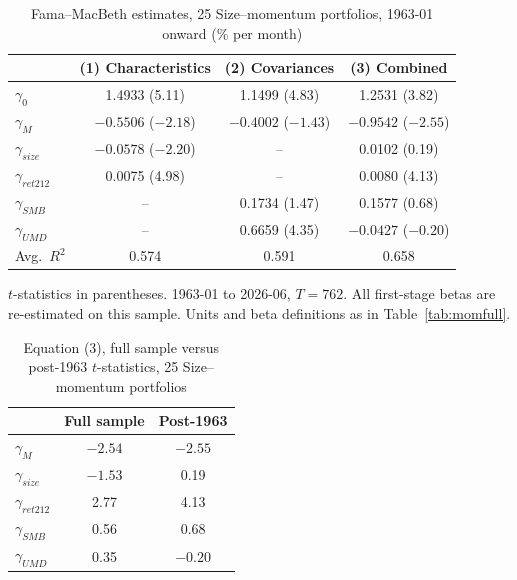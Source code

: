 \documentclass[11pt]{article}
\begin{document}
\begin{table}[H]\centering\small
\caption{Fama--MacBeth estimates, 25 Size--momentum portfolios, 1963-01 onward (\% per month)}
\begin{tabular}{lccc}
\toprule
 & (1) Characteristics & (2) Covariances & (3) Combined \\
\midrule
$\gamma_0$        & 1.4933 (5.11)       & 1.1499 (4.83)       & 1.2531 (3.82)       \\
$\gamma_M$        & $-0.5506$ ($-2.18$) & $-0.4002$ ($-1.43$) & $-0.9542$ ($-2.55$) \\
$\gamma_{size}$   & $-0.0578$ ($-2.20$) & --                  & 0.0102 (0.19)       \\
$\gamma_{ret212}$ & 0.0075 (4.98)       & --                  & 0.0080 (4.13)       \\
$\gamma_{SMB}$    & --                  & 0.1734 (1.47)       & 0.1577 (0.68)       \\
$\gamma_{UMD}$    & --                  & 0.6659 (4.35)       & $-0.0427$ ($-0.20$) \\
\midrule
Avg.\ $R^2$       & 0.574               & 0.591               & 0.658               \\
\bottomrule
\end{tabular}
\par\smallskip\footnotesize $t$-statistics in parentheses. 1963-01 to 2026-06, $T = 762$.
All first-stage betas are re-estimated on this sample. Units and beta definitions as in
Table~\ref{tab:momfull}.
\end{table}

\begin{table}[H]\centering\small
\caption{Equation (3), full sample versus post-1963 $t$-statistics, 25 Size--momentum portfolios}
\begin{tabular}{lcc}
\toprule
 & Full sample & Post-1963 \\
\midrule
$\gamma_M$        & $-2.54$ & $-2.55$ \\
$\gamma_{size}$   & $-1.53$ & 0.19    \\
$\gamma_{ret212}$ & 2.77    & 4.13    \\
$\gamma_{SMB}$    & 0.56    & 0.68    \\
$\gamma_{UMD}$    & 0.35    & $-0.20$ \\
\bottomrule
\end{tabular}
\end{table}
\end{document}
